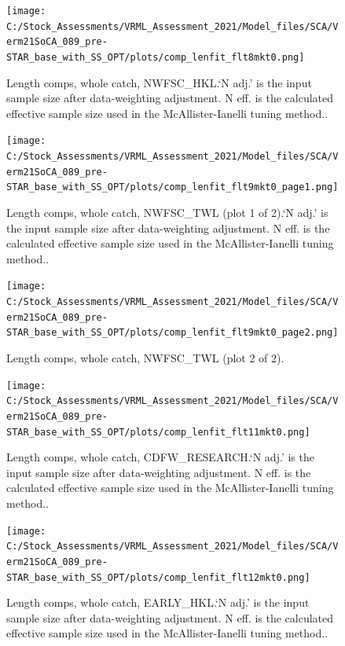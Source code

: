 \documentclass[
  english,
  a4paper,
]{article}
\begin{document}
\begin{figure}
\centering
\texttt{[image: C:/Stock\_Assessments/VRML\_Assessment\_2021/Model\_files/SCA/Verm21SoCA\_089\_pre-STAR\_base\_with\_SS\_OPT/plots/comp\_lenfit\_flt8mkt0.png]}
\caption{Length comps, whole catch, NWFSC\_HKL.`N adj.' is the input sample size after data-weighting adjustment. N eff. is the calculated effective sample size used in the McAllister-Ianelli tuning method..\label{fig:comp_lenfit_flt8mkt0}}
\end{figure}

\begin{figure}
\centering
\texttt{[image: C:/Stock\_Assessments/VRML\_Assessment\_2021/Model\_files/SCA/Verm21SoCA\_089\_pre-STAR\_base\_with\_SS\_OPT/plots/comp\_lenfit\_flt9mkt0\_page1.png]}
\caption{Length comps, whole catch, NWFSC\_TWL (plot 1 of 2).`N adj.' is the input sample size after data-weighting adjustment. N eff. is the calculated effective sample size used in the McAllister-Ianelli tuning method..\label{fig:comp_lenfit_flt9mkt0_page1}}
\end{figure}

\begin{figure}
\centering
\texttt{[image: C:/Stock\_Assessments/VRML\_Assessment\_2021/Model\_files/SCA/Verm21SoCA\_089\_pre-STAR\_base\_with\_SS\_OPT/plots/comp\_lenfit\_flt9mkt0\_page2.png]}
\caption{Length comps, whole catch, NWFSC\_TWL (plot 2 of 2).\label{fig:comp_lenfit_flt9mkt0_page2}}
\end{figure}

\begin{figure}
\centering
\texttt{[image: C:/Stock\_Assessments/VRML\_Assessment\_2021/Model\_files/SCA/Verm21SoCA\_089\_pre-STAR\_base\_with\_SS\_OPT/plots/comp\_lenfit\_flt11mkt0.png]}
\caption{Length comps, whole catch, CDFW\_RESEARCH.`N adj.' is the input sample size after data-weighting adjustment. N eff. is the calculated effective sample size used in the McAllister-Ianelli tuning method..\label{fig:comp_lenfit_flt11mkt0}}
\end{figure}

\begin{figure}
\centering
\texttt{[image: C:/Stock\_Assessments/VRML\_Assessment\_2021/Model\_files/SCA/Verm21SoCA\_089\_pre-STAR\_base\_with\_SS\_OPT/plots/comp\_lenfit\_flt12mkt0.png]}
\caption{Length comps, whole catch, EARLY\_HKL.`N adj.' is the input sample size after data-weighting adjustment. N eff. is the calculated effective sample size used in the McAllister-Ianelli tuning method..\label{fig:comp_lenfit_flt12mkt0}}
\end{figure}
\end{document}
